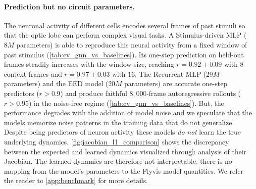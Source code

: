 \documentclass{article}
\def\stimbase{Stimulus-driven MLP}
\def\eedbase{EED model}
\def\mlpbase{Recurrent MLP}
\begin{document}


\paragraph{Prediction but no circuit parameters.}


The neuronal activity of different cells encodes several frames of past
stimuli so that the optic lobe can perform complex visual tasks. A
\stimbase{} ($8M$ parameters) is able to reproduce this neural activity from a fixed window of past stimulus (\cref{tab:cv_gnn_vs_baselines}). Its one-step prediction on held-out frames
steadily increases with the window size, reaching $r = 0.92 \pm 0.09$
with $8$ context frames and $r = 0.97 \pm 0.03$ with $16$.
The \mlpbase{} ($29M$ parameters) and the \eedbase{} ($20M$ parameters) are
accurate one-step predictors ($r > 0.9$) and produce
faithful $8{,}000$-frame autoregressive rollouts ($r > 0.95$) in the noise-free
regime (\cref{tab:cv_gnn_vs_baselines}). But, the performance degrades with the addition of model noise and we speculate that the models memorize noise patterns in the training data that do not generalize. Despite being predictors of neuron activity these models \emph{do not} learn the true underlying dynamics. \cref{fig:jacobian_l1_comparison} shows the discrepancy between the expected and learned dynamics visualized through analysis of their Jacobian. 
The learned dynamics are therefore not interpretable, there is no
mapping from the model's parameters to the Flyvis model quantities. We refer the reader to \cref{app:benchmark} for more details.
\end{document}
